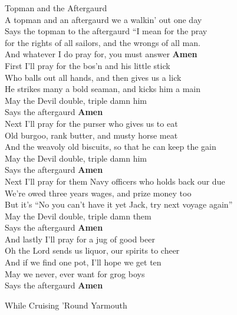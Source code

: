 \documentclass[letterpaper,9pt]{article}
\begin{document}
\newpage
{}
\Huge
Topman and the Aftergaurd\\

\LARGE
A topman and an aftergaurd we a walkin' out one day \\
Says the topman to the aftergaurd “I mean for the pray \\
for the rights of all sailors, and the wrongs of all man. \\
And whatever I do pray for, you must answer \textbf{Amen} \\

First I'll pray for the bos'n and his little stick \\
Who balls out all hands, and then gives us a lick \\
He strikes many a bold seaman, and kicks him a main \\
May the Devil double, triple damn him \\
Says the aftergaurd \textbf{Amen} \\

Next I'll pray for the purser who gives us to eat \\
Old burgoo, rank butter, and musty horse meat \\
And the weavoly old biscuits, so that he can keep the gain \\
May the Devil double, triple damn him \\
Says the aftergaurd \textbf{Amen} \\

Next I'll pray for them Navy officers who holds back our due \\
We're owed three years wages, and prize money too \\
But it's “No you can't have it yet Jack, try next voyage again” \\
May the Devil double, triple damn them \\
Says the aftergaurd \textbf{Amen} \\

And lastly I'll pray for a jug of good beer \\
Oh the Lord sends us liquor, our spirits to cheer \\
And if we find one pot, I'll hope we get ten \\
May we never, ever want for grog boys \\
Says the aftergaurd \textbf{Amen} \\

\newpage
{}
\Huge
While Cruising 'Round Yarmouth\\
\end{document}
